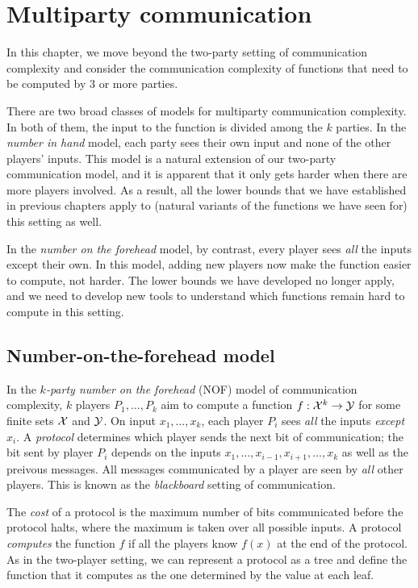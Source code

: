 \chapter[CH07]{Multiparty communication}


In this chapter, we move beyond the two-party setting of communication complexity and consider the communication complexity of functions that need to be computed by 3 or more parties.

There are two broad classes of models for multiparty communication complexity. In both of them, the input to the function is divided among the $k$ parties. In the \emph{number in hand} model, each party sees their own input and none of the other players' inputs. This model is a natural extension of our two-party communication model, and it is apparent that it only gets harder when there are more players involved. As a result, all the lower bounds that we have established in previous chapters apply to (natural variants of the functions we have seen for) this setting as well.

In the \emph{number on the forehead} model, by contrast, every player sees \emph{all} the inputs except their own. In this model, adding new players now make the function easier to compute, not harder. The lower bounds we have developed no longer apply, and we need to develop new tools to understand which functions remain hard to compute in this setting.

\newpage

\section{Number-on-the-forehead model}

In the \emph{$k$-party number on the forehead} (NOF) model of communication complexity, $k$ players $P_1,\ldots,P_k$ aim to compute a function $f : \mathcal{X}^k \to \mathcal{Y}$ for some finite sets $\mathcal{X}$ and $\mathcal{Y}$. On input $x_1,\ldots,x_k$, each player $P_i$ sees \emph{all} the inputs \emph{except} $x_i$. A \emph{protocol} determines which player sends the next bit of communication; the bit sent by player $P_i$ depends on the inputs $x_1,\ldots,x_{i-1},x_{i+1},\ldots,x_k$ as well as the preivous messages. All messages communicated by a player are seen by \emph{all} other players. This is known as the \emph{blackboard} setting of communication.

The \emph{cost} of a protocol is the maximum number of bits communicated before the protocol halts, where the maximum is taken over all possible inputs. A protocol \emph{computes} the function $f$ if all the players know $f(x)$ at the end of the protocol. As in the two-player setting, we can represent a protocol as a tree and define the function that it computes as the one determined by the value at each leaf.

